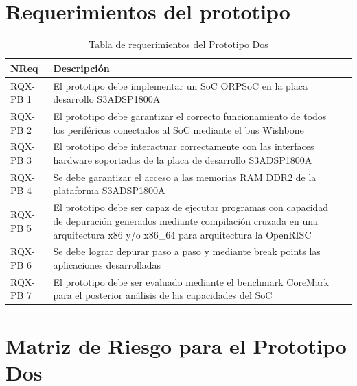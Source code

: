 		\section{Requerimientos del prototipo}
		\begin{table}[h!]
		\centering
		\begin{tabular}{ p{2.5cm} p{8cm} p{3cm} }
		\hline 
		\rowcolor[gray]{0.8} N\textordmasculine Req & Descripción\\
		\hline 
		RQX-PB 1 & El prototipo debe implementar un SoC ORPSoC en la placa desarrollo S3ADSP1800A\\ 
		\hline 
		RQX-PB 2 & El prototipo debe garantizar el correcto funcionamiento de todos los periféricos conectados al SoC mediante el bus Wishbone\\ 
		\hline 
		RQX-PB 3 & El prototipo debe interactuar correctamente con las interfaces hardware soportadas de la placa de desarrollo S3ADSP1800A\\ 
		\hline
		RQX-PB 4 & Se debe garantizar el acceso a las memorias RAM DDR2 de la plataforma S3ADSP1800A\\
		\hline
		RQX-PB 5 & El prototipo debe ser capaz de ejecutar programas con capacidad de depuración generados mediante compilación
		cruzada en una arquitectura x86 y/o x86\_64 para arquitectura la OpenRISC\\
		\hline
		RQX-PB 6 & Se debe lograr depurar paso a paso y mediante break points las aplicaciones desarrolladas\\
		\hline
		RQX-PB 7 & El prototipo debe ser evaluado mediante el benchmark CoreMark para el posterior análisis de las capacidades del SoC\\
		\hline		
		\end{tabular}
		\caption{Tabla de requerimientos del Prototipo Dos}
		\end{table}

\newpage
		\section{Matriz de Riesgo para el Prototipo Dos} 

